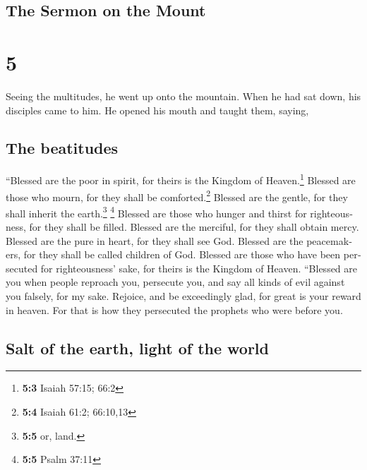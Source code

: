 \begin{paracol}{2}
\switchcolumn
\begin{otherlanguage}{english}

\hypertarget{the-sermon-on-the-mount}{%
\subsection{The Sermon on the Mount}\label{the-sermon-on-the-mount}}

\hypertarget{section-9}{%
\section{5}\label{section-9}}

 Seeing the multitudes, he went up onto the mountain. When
he had sat down, his disciples came to him.  He opened his
mouth and taught them, saying,

\hypertarget{the-beatitudes}{%
\subsection{The beatitudes}\label{the-beatitudes}}

 ``Blessed are the poor in spirit, for theirs is the
Kingdom of Heaven.\footnote{\textbf{5:3} Isaiah 57:15; 66:2}
 Blessed are those who mourn, for they shall be
comforted.\footnote{\textbf{5:4} Isaiah 61:2; 66:10,13} 
Blessed are the gentle, for they shall inherit the earth.\footnote{\textbf{5:5}
  or, land.} \footnote{\textbf{5:5} Psalm 37:11}  Blessed
are those who hunger and thirst for righteousness, for they shall be
filled.  Blessed are the merciful, for they shall obtain
mercy.  Blessed are the pure in heart, for they shall see
God.  Blessed are the peacemakers, for they shall be
called children of God.  Blessed are those who have been
persecuted for righteousness' sake, for theirs is the Kingdom of Heaven.
 ``Blessed are you when people reproach you, persecute
you, and say all kinds of evil against you falsely, for my sake.
 Rejoice, and be exceedingly glad, for great is your
reward in heaven. For that is how they persecuted the prophets who were
before you.

\hypertarget{salt-of-the-earth-light-of-the-world}{%
\subsection{Salt of the earth, light of the
world}\label{salt-of-the-earth-light-of-the-world}}


\end{otherlanguage}
\end{paracol}
